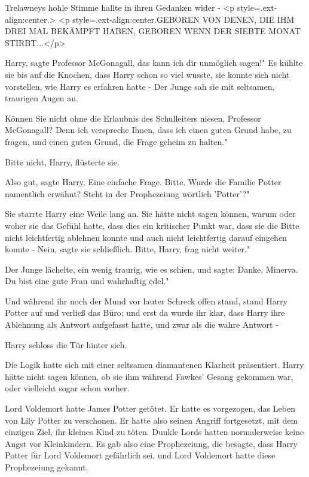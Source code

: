 Trelawneys hohle Stimme hallte in ihren Gedanken wider - <p
style=\grqq{}.ext-align:center\grqq{}.> <p
style=\grqq{}.ext-align:center\grqq{}.GEBOREN VON DENEN, DIE IHM DREI MAL
BEKÄMPFT HABEN, GEBOREN WENN DER SIEBTE MONAT STIRBT...</p>

\glqq Harry\grqq{}, sagte Professor McGonagall, \glqq das kann ich dir unmöglich
sagen!" Es kühlte sie bis auf die Knochen, dass Harry schon so viel wusste, sie
konnte sich nicht vorstellen, wie Harry es erfahren hatte - Der Junge sah sie
mit seltsamen, traurigen Augen an.

\glqq Können Sie nicht ohne die Erlaubnis des Schulleiters niesen, Professor
McGonagall? Denn ich verspreche Ihnen, dass ich einen guten Grund habe, zu
fragen, und einen guten Grund, die Frage geheim zu halten."

\glqq Bitte nicht, Harry\grqq{}, flüsterte sie.

\glqq Also gut\grqq{}, sagte Harry. \glqq Eine einfache Frage. Bitte. Wurde die
Familie Potter namentlich erwähnt? Steht in der Prophezeiung wörtlich 'Potter'?"

Sie starrte Harry eine Weile lang an. Sie hätte nicht sagen können, warum oder
woher sie das Gefühl hatte, dass dies ein kritischer Punkt war, dass sie die
Bitte nicht leichtfertig ablehnen konnte und auch nicht leichtfertig darauf
eingehen konnte - \glqq Nein\grqq{}, sagte sie schließlich. \glqq Bitte, Harry,
frag nicht weiter."

Der Junge lächelte, ein wenig traurig, wie es schien, und sagte: \glqq Danke,
Minerva. Du bist eine gute Frau und wahrhaftig edel."

Und während ihr noch der Mund vor lauter Schreck offen stand, stand Harry Potter
auf und verließ das Büro; und erst da wurde ihr klar, dass Harry ihre Ablehnung
als Antwort aufgefasst hatte, und zwar als die wahre Antwort -

Harry schloss die Tür hinter sich.

Die Logik hatte sich mit einer seltsamen diamantenen Klarheit präsentiert. Harry
hätte nicht sagen können, ob sie ihm während Fawkes' Gesang gekommen war, oder
vielleicht sogar schon vorher.

Lord Voldemort hatte James Potter getötet. Er hatte es vorgezogen, das Leben von
Lily Potter zu verschonen. Er hatte also seinen Angriff fortgesetzt, mit dem
einzigen Ziel, ihr kleines Kind zu töten. Dunkle Lords hatten normalerweise
keine Angst vor Kleinkindern. Es gab also eine Prophezeiung, die besagte, dass
Harry Potter für Lord Voldemort gefährlich sei, und Lord Voldemort hatte diese
Prophezeiung gekannt.

